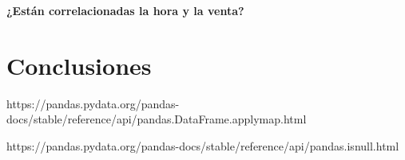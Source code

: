 \documentclass[11pt,spanish]{article}
\begin{document}
\vspace{3mm}

\textbf{¿Están correlacionadas la hora y la venta?}

\vspace{3mm}

\section{Conclusiones}




\begin{thebibliography}{99}


https://pandas.pydata.org/pandas-docs/stable/reference/api/pandas.DataFrame.applymap.html

https://pandas.pydata.org/pandas-docs/stable/reference/api/pandas.isnull.html

\end{thebibliography}
\end{document}
